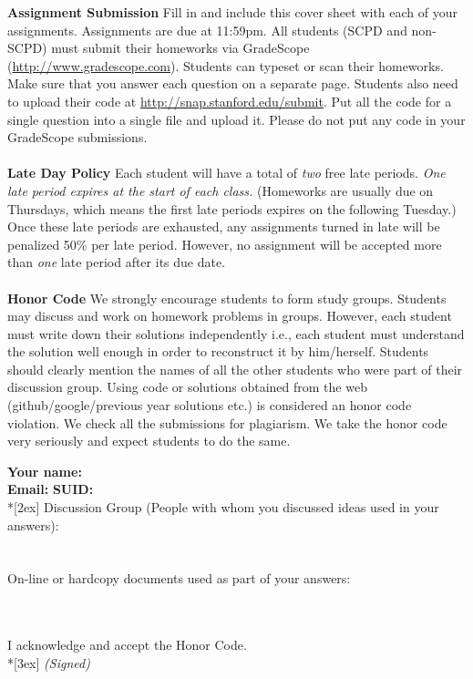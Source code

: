 \documentclass[11pt]{article}
\begin{document}
\textbf{Assignment Submission } Fill in and include this cover sheet with each of your assignments. Assignments are due at 11:59pm. All students (SCPD and non-SCPD) must submit their homeworks via GradeScope (\url{http://www.gradescope.com}). Students can typeset or scan their homeworks. Make sure that you answer each question on a separate page. Students also need to upload their code at \url{http://snap.stanford.edu/submit}. Put all the code for a single question into a single file and upload it. Please do not put any code in your GradeScope submissions. 
\\
\\
\textbf{Late Day Policy } Each student will have a total of {\em two} free late periods. {\em One late period expires at the start of each class.} (Homeworks are usually due on Thursdays, which means the first late periods expires on the following Tuesday.) Once these late periods are exhausted, any assignments turned in late will be penalized 50\% per late period. However, no assignment will be accepted more than {\em one} late period after its due date. 
\\
\\
\textbf{Honor Code } We strongly encourage students to form study groups. Students may discuss and work on homework problems in groups. However, each student must write down their solutions independently i.e., each student must understand the solution well enough in order to reconstruct it by him/herself.  Students should clearly mention the names of all the other students who were part of their discussion group. Using code or solutions obtained from the web (github/google/previous year solutions etc.) is considered an honor code violation. We check all the submissions for plagiarism. We take the honor code very seriously and expect students to do the same. 

\vfill
\vfill

{\Large
\textbf{Your name:} \hrulefill \\
\textbf{Email:} \underline{\hspace*{7cm}} \textbf{SUID:} \hrulefill\\*[2ex] }
Discussion Group (People with whom you discussed ideas used in your answers): \\\\\\
On-line or hardcopy documents used as part of your answers: \\\\\\
\vfill

\vfill

I acknowledge and accept the Honor Code.\\*[3ex]
\bigskip
\textit{(Signed)}\hrulefill

\vfill
\vfill
\end{document}
